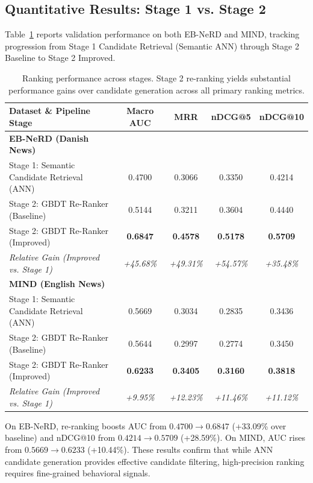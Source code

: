 \documentclass[11pt,a4paper]{article}
\begin{document}
\subsection{Quantitative Results: Stage 1 vs. Stage 2}
Table~\ref{tab:stage1_vs_stage2} reports validation performance on both EB-NeRD and MIND, tracking progression from Stage 1 Candidate Retrieval (Semantic ANN) through Stage 2 Baseline to Stage 2 Improved.

\begin{table}[htbp]
\centering
\small
\setlength{\tabcolsep}{3.5pt}
\begin{tabular}{lcccc}
\toprule
\textbf{Dataset \& Pipeline Stage} & \textbf{Macro AUC} & \textbf{MRR} & \textbf{nDCG@5} & \textbf{nDCG@10} \\
\midrule
\textbf{EB-NeRD (Danish News)} & & & & \\
\quad Stage 1: Semantic Candidate Retrieval (ANN) & 0.4700 & 0.3066 & 0.3350 & 0.4214 \\
\quad Stage 2: GBDT Re-Ranker (Baseline)          & 0.5144 & 0.3211 & 0.3604 & 0.4440 \\
\quad Stage 2: GBDT Re-Ranker (Improved)          & \textbf{0.6847} & \textbf{0.4578} & \textbf{0.5178} & \textbf{0.5709} \\
\quad \textit{Relative Gain (Improved vs. Stage 1)} & \textit{+45.68\%} & \textit{+49.31\%} & \textit{+54.57\%} & \textit{+35.48\%} \\
\midrule
\textbf{MIND (English News)} & & & & \\
\quad Stage 1: Semantic Candidate Retrieval (ANN) & 0.5669 & 0.3034 & 0.2835 & 0.3436 \\
\quad Stage 2: GBDT Re-Ranker (Baseline)          & 0.5644 & 0.2997 & 0.2774 & 0.3450 \\
\quad Stage 2: GBDT Re-Ranker (Improved)          & \textbf{0.6233} & \textbf{0.3405} & \textbf{0.3160} & \textbf{0.3818} \\
\quad \textit{Relative Gain (Improved vs. Stage 1)} & \textit{+9.95\%} & \textit{+12.23\%} & \textit{+11.46\%} & \textit{+11.12\%} \\
\bottomrule
\end{tabular}
\caption{Ranking performance across stages. Stage 2 re-ranking yields substantial performance gains over candidate generation across all primary ranking metrics.}
\label{tab:stage1_vs_stage2}
\end{table}

On EB-NeRD, re-ranking boosts AUC from $0.4700 \to 0.6847$ (+33.09\% over baseline) and nDCG@10 from $0.4214 \to 0.5709$ (+28.59\%). On MIND, AUC rises from $0.5669 \to 0.6233$ (+10.44\%). These results confirm that while ANN candidate generation provides effective candidate filtering, high-precision ranking requires fine-grained behavioral signals.
\end{document}
